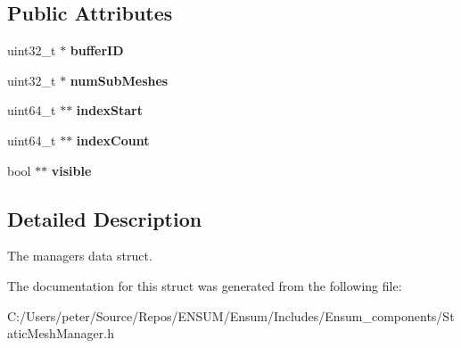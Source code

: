 \subsection*{Public Attributes}
\begin{DoxyCompactItemize}
\item 
uint32\+\_\+t $\ast$ {\bfseries buffer\+ID}\hypertarget{struct_ensum_1_1_components_1_1_static_mesh_manager_1_1_mesh_component_a3797586ec1e14a2108e36fe238638b44}{}\label{struct_ensum_1_1_components_1_1_static_mesh_manager_1_1_mesh_component_a3797586ec1e14a2108e36fe238638b44}

\item 
uint32\+\_\+t $\ast$ {\bfseries num\+Sub\+Meshes}\hypertarget{struct_ensum_1_1_components_1_1_static_mesh_manager_1_1_mesh_component_a44f17e361b43b8ececaf97f320cc8ed9}{}\label{struct_ensum_1_1_components_1_1_static_mesh_manager_1_1_mesh_component_a44f17e361b43b8ececaf97f320cc8ed9}

\item 
uint64\+\_\+t $\ast$$\ast$ {\bfseries index\+Start}\hypertarget{struct_ensum_1_1_components_1_1_static_mesh_manager_1_1_mesh_component_ab03342643178c69d0c04b88b0af738cb}{}\label{struct_ensum_1_1_components_1_1_static_mesh_manager_1_1_mesh_component_ab03342643178c69d0c04b88b0af738cb}

\item 
uint64\+\_\+t $\ast$$\ast$ {\bfseries index\+Count}\hypertarget{struct_ensum_1_1_components_1_1_static_mesh_manager_1_1_mesh_component_a8a4a39ae87a62004985ca73238e9896a}{}\label{struct_ensum_1_1_components_1_1_static_mesh_manager_1_1_mesh_component_a8a4a39ae87a62004985ca73238e9896a}

\item 
bool $\ast$$\ast$ {\bfseries visible}\hypertarget{struct_ensum_1_1_components_1_1_static_mesh_manager_1_1_mesh_component_a83491ddc3b2880efcdcdb22b761606ec}{}\label{struct_ensum_1_1_components_1_1_static_mesh_manager_1_1_mesh_component_a83491ddc3b2880efcdcdb22b761606ec}

\end{DoxyCompactItemize}


\subsection{Detailed Description}
The managers data struct. 

The documentation for this struct was generated from the following file\+:\begin{DoxyCompactItemize}
\item 
C\+:/\+Users/peter/\+Source/\+Repos/\+E\+N\+S\+U\+M/\+Ensum/\+Includes/\+Ensum\+\_\+components/Static\+Mesh\+Manager.\+h\end{DoxyCompactItemize}
